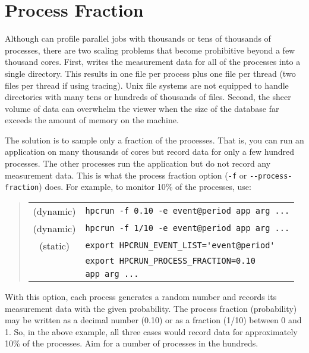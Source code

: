 
\section{Process Fraction}

Although \hpcrun{} can profile parallel jobs with thousands or tens of
thousands of processes, there are two scaling problems that become
prohibitive beyond a few thousand cores.  First, \hpcrun{} writes the
measurement data for all of the processes into a single directory.
This results in one file per process plus one file per thread (two
files per thread if using tracing).  Unix file systems are not
equipped to handle directories with many tens or hundreds of thousands
of files.  Second, the sheer volume of data can overwhelm the viewer
when the size of the database far exceeds the amount of memory on the
machine.

The solution is to sample only a fraction of the processes.  That is,
you can run an application on many thousands of cores but record data
for only a few hundred processes.  The other processes run the
application but do not record any measurement data.  This is what the
process fraction option (\verb|-f| or \verb|--process-fraction|) does.
For example, to monitor 10\% of the processes, use:

\begin{quote}
\begin{tabular}{@{}cl}
(dynamic) & \verb|hpcrun -f 0.10 -e event@period app arg ...| \\
(dynamic) & \verb|hpcrun -f 1/10 -e event@period app arg ...| \\
(static)  & \verb|export HPCRUN_EVENT_LIST='event@period'| \\
& \verb|export HPCRUN_PROCESS_FRACTION=0.10| \\
& \verb|app arg ...|
\end{tabular}
\end{quote}

With this option, each process generates a random number and records
its measurement data with the given probability.  The process fraction
(probability) may be written as a decimal number (0.10) or as a
fraction (1/10) between 0 and 1.  So, in the above example, all three
cases would record data for approximately 10\% of the processes.  Aim
for a number of processes in the hundreds.


